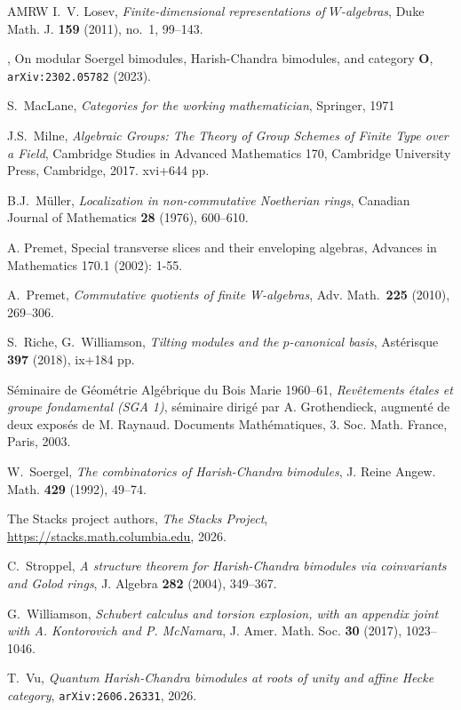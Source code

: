 \documentclass[twoside,12pt,reqno]{amsart}
\theoremstyle{remark}
\numberwithin{equation}{section}
\newcommand{\arxiv}[1]{{\tt arXiv:#1}}
\begin{document}
\begin{thebibliography}{AMRW}
I.~V. Losev,
{\it Finite-dimensional representations of $W$-algebras}, Duke Math. J. {\bf 159} (2011), no.~1, 99--143.


\bysame,
On modular Soergel bimodules, Harish-Chandra bimodules, and category $\mathbf{O}$,
\arxiv{2302.05782} (2023).

S.~MacLane, {\em Categories for the working mathematician}, Springer, 1971

J.S.~Milne, {\em Algebraic Groups: The Theory of Group Schemes of Finite Type over a Field},
Cambridge Studies in Advanced Mathematics 170, Cambridge University Press, Cambridge, 2017. xvi+644 pp.

B.J.~Müller, {\em Localization in non-commutative Noetherian rings},
Canadian Journal of Mathematics {\bf 28} (1976), 600--610.


A. Premet,
Special transverse slices and their enveloping algebras,
Advances in Mathematics 170.1 (2002): 1-55.

A.~Premet,
{\em Commutative quotients of finite W-algebras},
Adv. Math.\ {\bf 225} (2010), 269--306.


 S.~Riche, G.~Williamson, {\em Tilting modules and the $p$-canonical basis}, Ast\'{e}risque {\bf 397} (2018), ix+184 pp.


S\'{e}minaire de G\'{e}om\'{e}trie Alg\'{e}brique du Bois Marie 1960--61, {\em Rev\^{e}tements \'{e}tales et groupe fondamental (SGA 1)}, s\'{e}minaire dirig\'{e} par A. Grothendieck, augment\'{e} de deux expos\'{e}s de M. Raynaud. Documents Math\'{e}matiques, 3. Soc. Math. France, Paris, 2003.


 W.~Soergel, {\em The combinatorics of Harish-Chandra bimodules}, J. Reine Angew. Math. {\bf 429} (1992), 49--74.

 The Stacks project authors, {\em The Stacks Project}, \url{https://stacks.math.columbia.edu}, 2026.

 C.~Stroppel, {\em A structure theorem for Harish-Chandra bimodules via coinvariants and
Golod rings}, J. Algebra {\bf 282} (2004), 349--367.

 G.~Williamson, {\em Schubert calculus and torsion explosion, with an appendix joint with
A. Kontorovich and P. McNamara}, J. Amer. Math. Soc. {\bf 30} (2017), 1023--1046.

 T.~Vu, {\em Quantum Harish-Chandra bimodules at roots of unity and affine Hecke category}, \arxiv{2606.26331}, 2026.


	\end{thebibliography}	
	
\end{document}
